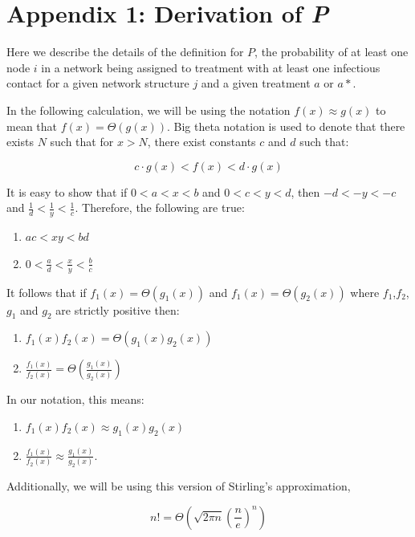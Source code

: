 \documentclass{article}
\theoremstyle{definition}
\begin{document}
\newpage



\newpage


\appendix
{}
\section{Appendix 1: Derivation of  \textit{P}}
\label{Appendix 1}
Here we describe the details of the definition for $P$, the probability of at least one node $i$ in a network being assigned to treatment with at least one infectious contact for a given network structure $j$ and a given treatment $a$ or $a*$.

In the following calculation, we will be using the notation $f(x)\approx g(x)$ to mean that $f(x)=\Theta(g(x))$. Big theta notation is used to denote that there exists $N$ such that for $x>N$, there exist constants $c$ and $d$ such that:

 $$c\cdot g(x)< f(x) < d \cdot g(x) $$

It is easy to show that if $0<a<x<b$ and $0<c<y<d$, then $-d<-y<-c$ and $\frac{1}{d}<\frac{1}{y}<\frac{1}{c}$.  Therefore, the following are true:
\begin{enumerate}
\item $ac<xy<bd$
\item $0<\frac{a}{d}<\frac{x}{y}<\frac{b}{c}$
\end{enumerate}

It follows that if $f_1(x)=\Theta{\left(g_1(x)\right)}$ and $f_1(x)=\Theta{\left(g_2(x)\right)}$ where $f_1$,$f_2$, $g_1$ and $g_2$ are strictly positive then:
\begin{enumerate}
\item $f_1(x)f_2(x)=\Theta{\left(g_1(x)g_2(x)\right)}$
\item $\frac{f_1(x)}{f_2(x)}=\Theta{\left(\frac{g_1(x)}{g_2(x)}\right)}$
\end{enumerate}

In our notation, this means:
\begin{enumerate}
     \item $f_1(x)f_2(x)\approx g_1(x)g_2(x)$ 
     \item $\frac{f_1(x)}{f_2(x)}\approx \frac{g_1(x)}{g_2(x)}$.
\end{enumerate}


Additionally, we will be using this version of Stirling's approximation,

$$n!= \Theta\left(\sqrt{2\pi n}\left(\frac{n}{e}\right)^n \right)$$
\end{document}
